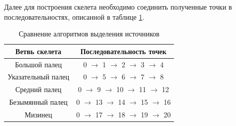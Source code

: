 Далее для построения скелета необходимо соединить полученные точки в последовательностях, описанной в таблице \ref{tab:keypoints_skeleton}.

\begin{table}[h]
	\caption{\label{tab:keypoints_skeleton}Сравнение алгоритмов выделения источников}
	\begin{center}
		\begin{tabular}{|c|c|}
			\hline
			Ветвь скелета & Последовательность точек \\
			\hline
			Большой палец & 0 $\rightarrow$ 1 $\rightarrow$ 2 $\rightarrow$ 3 $\rightarrow$ 4 \\
			Указательный палец & 0 $\rightarrow$ 5 $\rightarrow$ 6 $\rightarrow$ 7 $\rightarrow$ 8 \\
			Средний палец & 0 $\rightarrow$ 9 $\rightarrow$ 10 $\rightarrow$ 11 $\rightarrow$ 12 \\
			Безымянный палец & 0 $\rightarrow$ 13 $\rightarrow$ 14 $\rightarrow$ 15 $\rightarrow$ 16 \\
			Мизинец & 0 $\rightarrow$ 17 $\rightarrow$ 18 $\rightarrow$ 19 $\rightarrow$ 20 \\
			\hline
		\end{tabular}
	\end{center}
\end{table} 